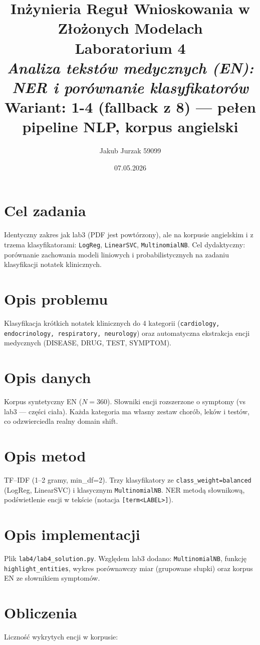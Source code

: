 \documentclass[12pt,a4paper]{article}
\title{
  \vspace{2cm}
  \LARGE\textbf{Inżynieria Reguł Wnioskowania w Złożonych Modelach}\\[0.6cm]
  \Large Laboratorium 4\\[0.4cm]
  \large \textit{Analiza tekstów medycznych (EN): NER i porównanie klasyfikatorów}\\[0.3cm]
  \normalsize Wariant: \textbf{1-4 (fallback z 8) — pełen pipeline NLP, korpus angielski}
}
\author{Jakub Jurzak 59099}
\date{07.05.2026}
\begin{document}
\maketitle
\thispagestyle{empty}
\newpage

\tableofcontents
\newpage

\section{Cel zadania}
Identyczny zakres jak lab3 (PDF jest powtórzony), ale na korpusie angielskim i z trzema klasyfikatorami: \texttt{LogReg}, \texttt{LinearSVC}, \texttt{MultinomialNB}. Cel dydaktyczny: porównanie zachowania modeli liniowych i probabilistycznych na zadaniu klasyfikacji notatek klinicznych.

\section{Opis problemu}
Klasyfikacja krótkich notatek klinicznych do 4 kategorii (\texttt{cardiology, endocrinology, respiratory, neurology}) oraz automatyczna ekstrakcja encji medycznych (DISEASE, DRUG, TEST, SYMPTOM).

\section{Opis danych}
Korpus syntetyczny EN ($N=360$). Słowniki encji rozszerzone o symptomy (vs lab3 — części ciała). Każda kategoria ma własny zestaw chorób, leków i testów, co odzwierciedla realny domain shift.

\section{Opis metod}
TF--IDF (1--2 gramy, min\_df=2). Trzy klasyfikatory ze \texttt{class\_weight=balanced} (LogReg, LinearSVC) i klasycznym \texttt{MultinomialNB}. NER metodą słownikową, podświetlenie encji w tekście (notacja \texttt{[term<LABEL>]}).

\section{Opis implementacji}
Plik \texttt{lab4/lab4\_solution.py}. Względem lab3 dodano: \texttt{MultinomialNB}, funkcję \texttt{highlight\_entities}, wykres porównawczy miar (grupowane słupki) oraz korpus EN ze słownikiem symptomów.

\section{Obliczenia}
Liczność wykrytych encji w korpusie:
\end{document}
